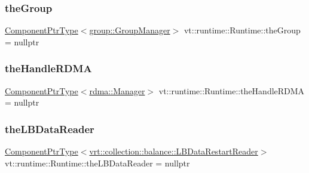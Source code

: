 \subsubsection{\texorpdfstring{the\+Group}{theGroup}}
{\footnotesize\ttfamily \hyperlink{structvt_1_1runtime_1_1_runtime_a0893bf0a8c03b898e8ab66b52cec80ad}{Component\+Ptr\+Type}$<$\hyperlink{structvt_1_1group_1_1_group_manager}{group\+::\+Group\+Manager}$>$ vt\+::runtime\+::\+Runtime\+::the\+Group = nullptr}

\mbox{\label{structvt_1_1runtime_1_1_runtime_a4772a2e3ae26f5dae29ea474ac0050c7}} 
\subsubsection{\texorpdfstring{the\+Handle\+R\+D\+MA}{theHandleRDMA}}
{\footnotesize\ttfamily \hyperlink{structvt_1_1runtime_1_1_runtime_a0893bf0a8c03b898e8ab66b52cec80ad}{Component\+Ptr\+Type}$<$\hyperlink{structvt_1_1rdma_1_1_manager}{rdma\+::\+Manager}$>$ vt\+::runtime\+::\+Runtime\+::the\+Handle\+R\+D\+MA = nullptr}

\mbox{\label{structvt_1_1runtime_1_1_runtime_afb8103d823cabc7bacb6035f785e9324}} 
\subsubsection{\texorpdfstring{the\+L\+B\+Data\+Reader}{theLBDataReader}}
{\footnotesize\ttfamily \hyperlink{structvt_1_1runtime_1_1_runtime_a0893bf0a8c03b898e8ab66b52cec80ad}{Component\+Ptr\+Type}$<$\hyperlink{structvt_1_1vrt_1_1collection_1_1balance_1_1_l_b_data_restart_reader}{vrt\+::collection\+::balance\+::\+L\+B\+Data\+Restart\+Reader}$>$ vt\+::runtime\+::\+Runtime\+::the\+L\+B\+Data\+Reader = nullptr}

\mbox{\label{structvt_1_1runtime_1_1_runtime_a0d324f5964ce89e2974a41bc3129829e}} 
